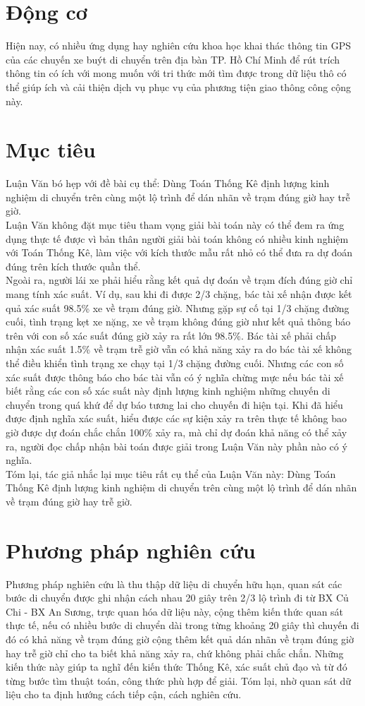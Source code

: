 \documentclass[a4paper, 13pt]{report}
\begin{document}
\section{Động cơ}
Hiện nay, có nhiều ứng dụng hay nghiên cứu khoa học khai thác thông tin GPS của các chuyến xe buýt di chuyển trên địa bàn TP. Hồ Chí Minh để rút trích thông tin có ích với mong muốn với tri thức mới tìm được trong dữ liệu thô có thể giúp ích và cải thiện dịch vụ phục vụ của phương tiện giao thông công cộng này.\\
\section{Mục tiêu}
Luận Văn bó hẹp với đề bài cụ thể: Dùng Toán Thống Kê định lượng kinh nghiệm di chuyển trên cùng một lộ trình để dán nhãn về trạm đúng giờ hay trễ giờ.\\
Luận Văn không đặt mục tiêu tham vọng giải bài toán này có thể đem ra ứng dụng thực tế được vì bản thân người giải bài toán không có nhiều kinh nghiệm với Toán Thống Kê, làm việc với kích thước mẫu rất nhỏ có thể đưa ra dự đoán đúng trên kích thước quần thể.\\
Ngoài ra, người lái xe phải hiểu rằng kết quả dự đoán về trạm đích đúng giờ chỉ mang tính xác suất. Ví dụ, sau khi đi được 2/3 chặng, bác tài xế nhận được kết quả xác suất 98.5\% xe về trạm đúng giờ. Nhưng gặp sự cố tại 1/3 chặng đường cuối, tình trạng kẹt xe nặng, xe về trạm không đúng giờ như kết quả thông báo trên với con số xác suất đúng giờ xảy ra rất lớn 98.5\%. Bác tài xế phải chấp nhận xác suất 1.5\% về trạm trễ giờ vẫn có khả năng xảy ra do bác tài xế không thể điều khiển tình trạng xe chạy tại 1/3 chặng đường cuối. Nhưng các con số xác suất được thông báo cho bác tài vẫn có ý nghĩa chừng mực nếu bác tài xế biết rằng các con số xác suất này định lượng kinh nghiệm những chuyến di chuyển trong quá khứ để dự báo tương lai cho chuyến đi hiện tại. Khi đã hiểu được định nghĩa xác suất, hiểu được các sự kiện xảy ra trên thực tế không bao giờ được dự đoán chắc chắn 100\% xảy ra, mà chỉ dự đoán khả năng có thể xảy ra, người đọc chấp nhận bài toán được giải trong Luận Văn này phần nào có ý nghĩa.\\
Tóm lại, tác giả nhắc lại mục tiêu rất cụ thể của Luận Văn này: Dùng Toán Thống Kê định lượng kinh nghiệm di chuyển trên cùng một lộ trình để dán nhãn về trạm đúng giờ hay trễ giờ.
\section{Phương pháp nghiên cứu}
Phương pháp nghiên cứu là thu thập dữ liệu di chuyển hữu hạn, quan sát các bước di chuyển được ghi nhận cách nhau 20 giây trên 2/3 lộ trình đi từ BX Củ Chi - BX An Sương, trực quan hóa dữ liệu này, cộng thêm kiến thức quan sát thực tế, nếu có nhiều bước di chuyển dài trong từng khoảng 20 giây thì chuyến đi đó có khả năng về trạm đúng giờ cộng thêm kết quả dán nhãn về trạm đúng giờ hay trễ giờ chỉ cho ta biết khả năng xảy ra, chứ không phải chắc chắn. Những kiến thức này giúp ta nghĩ đến kiến thức Thống Kê, xác suất chủ đạo và từ đó từng bước tìm thuật toán, công thức phù hợp để giải. Tóm lại, nhờ quan sát dữ liệu cho ta định hướng cách tiếp cận, cách nghiên cứu.  
\end{document}
